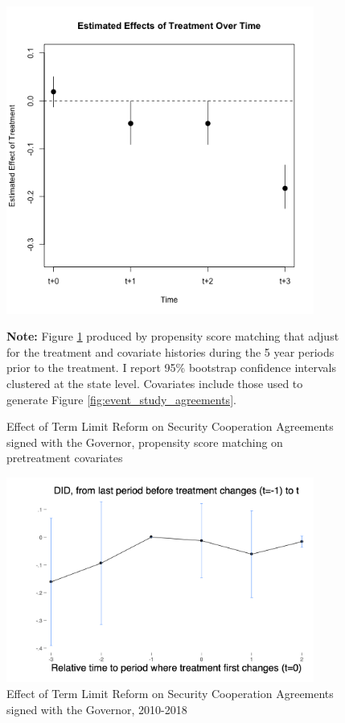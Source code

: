 \documentclass[12pt]{amsart}
\numberwithin{equation}{section}
\theoremstyle{definition}
\theoremstyle{definition}
\theoremstyle{definition}
\begin{document}
    
      
\begin{figure}[H] 
\centering
 \caption{Effect of Term Limit Reform on Security Cooperation Agreements signed with the Governor, propensity score matching on pretreatment covariates}
 \label{fig:matching}
\includegraphics[width=0.9\textwidth]{../Figures/acuerdo_gobestatal.png}
       \captionsetup{justification=centering}
       
        
 \textbf{Note:} Figure \ref{fig:matching} produced by propensity score matching that adjust for the treatment and covariate histories during the 5 year periods prior to the treatment. I report 95\% bootstrap confidence intervals clustered at the state level. Covariates include those used to generate Figure \ref{fig:event_study_agreements}. 

\end{figure}   
 
\begin{figure}[H] 
\centering
 \caption{Effect of Term Limit Reform on Security Cooperation Agreements signed with the Governor, 2010-2018}
 \label{fig:chaisemarting_agreements}
\includegraphics[width=0.9\textwidth]{../Figures/chaisemartin_acuerdo_estcom.png}
       \captionsetup{justification=centering}
\end{figure}   
\end{document}
